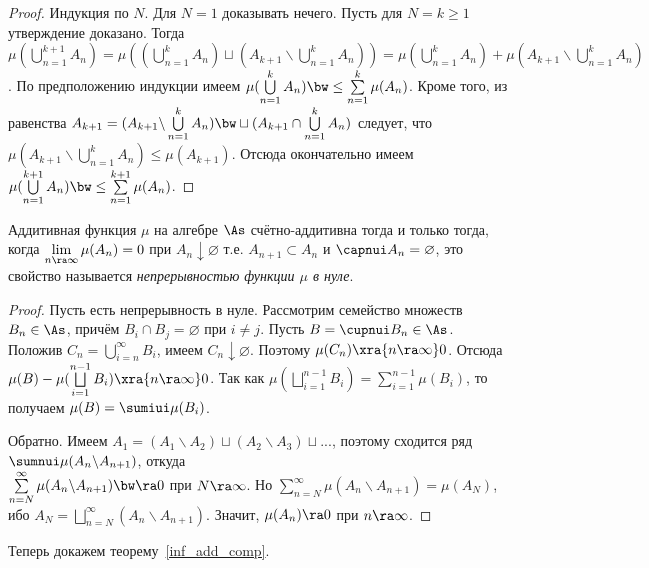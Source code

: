 \documentclass[10pt]{article}
\begin{document}
\begin{proof}
Индукция по $N$. Для $N=1$ доказывать нечего. Пусть для $N=k\ge1$
утверждение доказано. Тогда $\mu(\bigcup\limits_{n=1}^{k+1}A_n)
=\mu((\bigcup\limits_{n=1}^{k}A_n)\sqcup(A_{k+1}\backslash
\bigcup\limits_{n=1}^{k}A_n))=\mu(\bigcup\limits_{n=1}^{k}A_n)
+\mu(A_{k+1}\backslash \bigcup\limits_{n=1}^{k}A_n)$. По
предположению индукции имеем $\mu(\bigcup\limits_{n=1}^k
A_n)\bw\le\sum\limits_{n=1}^k \mu(A_n)$. Кроме того, из равенства
$A_{k+1}=(A_{k+1}\backslash \bigcup\limits_{n=1}^{k}A_n)
\bw\sqcup(A_{k+1}\cap \bigcup\limits_{n=1}^{k}A_n)$ следует, что
$\mu(A_{k+1}\backslash \bigcup\limits_{n=1}^{k}A_n)\le\mu(A_{k+1})$.
Отсюда окончательно имеем $\mu(\bigcup\limits_{n=1}^{k+1}A_n)
\bw\le\sum\limits_{n=1}^{k+1} \mu(A_n)$.
\end{proof}

\begin{prop}\label{inf_add}
Аддитивная функция $\mu$ на алгебре $\As$ счётно-аддитивна тогда и
только тогда, когда $\lim\limits_{n\ra\infty}\mu(A_n)=0$ при
$A_n\downarrow\varnothing$ \upshape{(}т.е. $A_{n+1}\subset A_n$ и
$\capnui A_n=\varnothing$, это свойство называется
\emph{непрерывностью функции $\mu$ в нуле}\upshape{)}.
\end{prop}

\begin{proof}
Пусть есть непрерывность в нуле. Рассмотрим семейство множеств
$B_n\in\As$, причём $B_i\cap B_j=\varnothing$ при $i\ne j$. Пусть
$B=\cupnui B_n\in\As$. Положив $C_n=\bigcup\limits_{i=n}^\infty
B_i$, имеем $C_n\downarrow\varnothing$. Поэтому
$\mu(C_n)\xra{n\ra\infty} 0$. Отсюда
$\mu(B)-\mu(\bigsqcup\limits_{i=1}^{n-1}B_i)\xra{n\ra\infty}0$. Так
как $\mu(\bigsqcup\limits_{i=1}^{n-1}B_i)
=\sum\limits_{i=1}^{n-1}\mu(B_i)$, то получаем
$\mu(B)=\sumiui\mu(B_i)$.

Обратно. Имеем $A_1=(A_1\backslash A_2)\sqcup(A_2\backslash
A_3)\sqcup...$, поэтому сходится ряд $\sumnui\mu(A_n\backslash
A_{n+1})$, откуда \\$\sum\limits_{n=N}^\infty \mu(A_n\backslash
A_{n+1})\bw\ra0$ при $N\ra\infty$. Но $\sum\limits_{n=N}^\infty
\mu(A_n\backslash A_{n+1})=\mu(A_N)$, ибо
$A_N=\bigsqcup\limits_{n=N}^\infty(A_n\backslash A_{n+1})$. Значит,
$\mu(A_n)\ra0$ при $n\ra\infty$.
\end{proof}

Теперь докажем теорему~\ref{inf_add_comp}.
\end{document}
